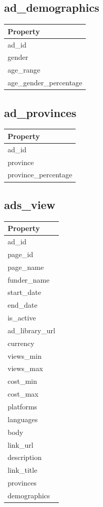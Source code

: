 \documentclass[
  letterpaper,
  DIV=11,
  numbers=noendperiod]{scrreprt}
\begin{document}
\subsection{ad\_demographics}

\begin{longtable}[]{@{}l@{}}
\toprule\noalign{}
Property \\
\midrule\noalign{}
\endhead
\bottomrule\noalign{}
\endlastfoot
ad\_id \\
gender \\
age\_range \\
age\_gender\_percentage \\
\end{longtable}

\subsection{ad\_provinces}

\begin{longtable}[]{@{}l@{}}
\toprule\noalign{}
Property \\
\midrule\noalign{}
\endhead
\bottomrule\noalign{}
\endlastfoot
ad\_id \\
province \\
province\_percentage \\
\end{longtable}

\subsection{ads\_view}

\begin{longtable}[]{@{}l@{}}
\toprule\noalign{}
Property \\
\midrule\noalign{}
\endhead
\bottomrule\noalign{}
\endlastfoot
ad\_id \\
page\_id \\
page\_name \\
funder\_name \\
start\_date \\
end\_date \\
is\_active \\
ad\_library\_url \\
currency \\
views\_min \\
views\_max \\
cost\_min \\
cost\_max \\
platforms \\
languages \\
body \\
link\_url \\
description \\
link\_title \\
provinces \\
demographics \\
\end{longtable}
\end{document}
